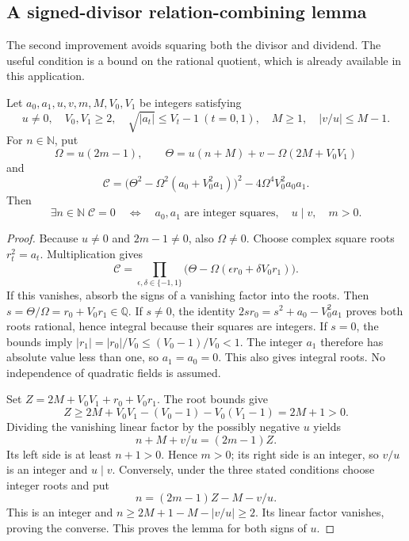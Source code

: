 \subsection{A signed-divisor relation-combining lemma}

The second improvement avoids squaring both the divisor and dividend.
The useful condition is a bound on the rational quotient, which is already
available in this application.

\begin{lemma}
\label{lem:signed-divisor-combiner}
Let $a_0,a_1,u,v,m,M,V_0,V_1$ be integers satisfying
\[
 u\ne0,\quad V_0,V_1\ge2,\quad
 \sqrt{|a_t|}\le V_t-1\ (t=0,1),\quad
 M\ge1,\quad |v/u|\le M-1.
\]
For $n\in\mathbb N$, put
\[
 \Omega=u(2m-1),\qquad
 \Theta=u(n+M)+v-\Omega(2M+V_0V_1)
\]
and
\[
 \mathcal C=
 \bigl(\Theta^2-\Omega^2(a_0+V_0^2a_1)\bigr)^2
                  -4\Omega^4V_0^2a_0a_1.
\]
Then
\[
 \exists n\in\mathbb N\;\mathcal C=0
 \quad\Longleftrightarrow\quad
 a_0,a_1\text{ are integer squares},\quad u\mid v,\quad m>0.
\]
\end{lemma}
\begin{proof}
Because $u\ne0$ and $2m-1\ne0$, also $\Omega\ne0$.
Choose complex square roots $r_t^2=a_t$. Multiplication gives
\[
 \mathcal C=
 \prod_{\epsilon,\delta\in\{-1,1\}}
       \bigl(\Theta-\Omega(\epsilon r_0+\delta V_0r_1)\bigr).
\]
If this vanishes, absorb the signs of a vanishing factor into the roots.
Then $s=\Theta/\Omega=r_0+V_0r_1\in\mathbb Q$. If $s\ne0$, the identity
$2sr_0=s^2+a_0-V_0^2a_1$ proves both roots rational, hence integral
because their squares are integers. If $s=0$, the bounds imply
$|r_1|=|r_0|/V_0\le(V_0-1)/V_0<1$. The integer $a_1$ therefore has
absolute value less than one, so $a_1=a_0=0$. This also gives integral
roots. No independence of quadratic fields is assumed.

Set $Z=2M+V_0V_1+r_0+V_0r_1$. The root bounds give
\[
 Z\ge2M+V_0V_1-(V_0-1)-V_0(V_1-1)=2M+1>0.
\]
Dividing the vanishing linear factor by the possibly negative $u$ yields
\[
 n+M+v/u=(2m-1)Z.
\]
Its left side is at least $n+1>0$. Hence $m>0$; its right side is an
integer, so $v/u$ is an integer and $u\mid v$.
Conversely, under the three stated conditions choose integer roots and put
\[
 n=(2m-1)Z-M-v/u.
\]
This is an integer and
$n\ge2M+1-M-|v/u|\ge2$. Its linear factor vanishes, proving the
converse. This proves the lemma for both signs of $u$.
\end{proof}

